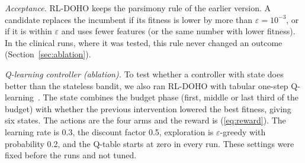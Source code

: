 \documentclass[journal]{IEEEtran}
\begin{document}
\emph{Acceptance.} RL-DOHO keeps the parsimony rule of the earlier version. A candidate replaces the incumbent if its fitness is lower by more than $\varepsilon=10^{-3}$, or if it is within $\varepsilon$ and uses fewer features (or the same number with lower fitness). In the clinical runs, where it was tested, this rule never changed an outcome (Section~\ref{sec:ablation}).

\emph{Q-learning controller (ablation).} To test whether a controller with state does better than the stateless bandit, we also ran RL-DOHO with tabular one-step Q-learning~\cite{watkins1992}. The state combines the budget phase (first, middle or last third of the budget) with whether the previous intervention lowered the best fitness, giving six states. The actions are the four arms and the reward is (\ref{eq:reward}). The learning rate is 0.3, the discount factor 0.5, exploration is $\varepsilon$-greedy with probability 0.2, and the Q-table starts at zero in every run. These settings were fixed before the runs and not tuned.
\end{document}
